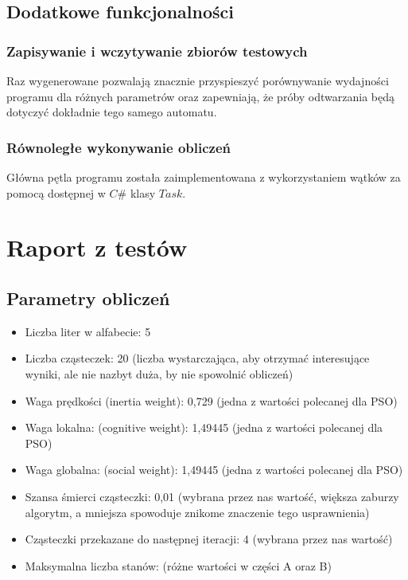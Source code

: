 \documentclass{../llncs_template_final/llncs}
\begin{document}
\subsection{Dodatkowe funkcjonalności}

\subsubsection{Zapisywanie i wczytywanie zbiorów testowych}
Raz wygenerowane pozwalają znacznie przyspieszyć porównywanie wydajności programu dla różnych parametrów oraz zapewniają, że próby odtwarzania będą dotyczyć dokładnie tego samego automatu.

\subsubsection{Równoległe wykonywanie obliczeń}
Główna pętla programu została zaimplementowana z wykorzystaniem wątków za pomocą dostępnej w $C\#$ klasy $Task$.

\newpage

\section{Raport z testów}

\subsection{Parametry obliczeń}

\begin{itemize}
\item Liczba liter w alfabecie: 5
\item Liczba cząsteczek: 20 (liczba wystarczająca, aby otrzymać interesujące wyniki, ale nie nazbyt duża, by nie spowolnić obliczeń)
\item Waga prędkości (inertia weight): 0,729 (jedna z wartości polecanej dla PSO)
\item Waga lokalna: (cognitive weight): 1,49445 (jedna z wartości polecanej dla PSO)
\item Waga globalna: (social weight): 1,49445	(jedna z wartości polecanej dla PSO)
\item Szansa śmierci cząsteczki: 0,01 (wybrana przez nas wartość, większa zaburzy algorytm, a mniejsza spowoduje znikome znaczenie tego usprawnienia)
\item Cząsteczki przekazane do następnej iteracji: 4 (wybrana przez nas wartość)
\item Maksymalna liczba stanów: (różne wartości w części A oraz B)
\end{itemize}
\end{document}
